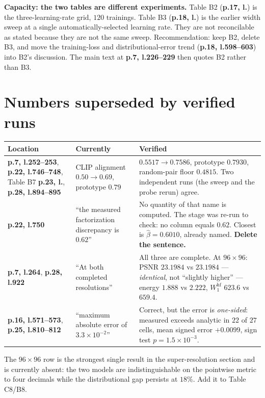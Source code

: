 \documentclass[11pt]{article}
\newcommand{\pl}[2]{\textbf{p.#1, l.#2}}
\begin{document}
\textbf{Capacity: the two tables are different experiments.} Table B2 (\pl{17}{}) is the
three-learning-rate grid, $120$ trainings. Table B3 (\pl{18}{}) is the earlier width sweep at a
single automatically-selected learning rate. They are not reconcilable as stated because they are
not the same sweep. Recommendation: keep B2, delete B3, and move the training-loss and
distributional-error trend (\pl{18}{598--603}) into B2's discussion. The main text at
\pl{7}{226--229} then quotes B2 rather than B3.

\section{Numbers superseded by verified runs}

\begin{longtable}{@{}p{}p{}p{}@{}}
\toprule
Location & Currently & Verified\\
\midrule
\endhead
\pl{7}{252--253}, \pl{22}{746--748}, Table B7 \pl{23}{}, \pl{28}{894--895} &
CLIP alignment $0.50\to0.69$, prototype $0.79$ &
$0.5517\to0.7586$, prototype $0.7930$, random-pair floor $0.4815$. Two independent runs (the
sweep and the probe rerun) agree.\\
\addlinespace
\pl{22}{750} & ``the measured factorization discrepancy is $0.62$'' &
No quantity of that name is computed. The stage was re-run to check: no column equals $0.62$.
Closest is $\hat\beta=0.6010$, already named. \textbf{Delete the sentence.}\\
\addlinespace
\pl{7}{264}, \pl{28}{922} & ``At both completed resolutions'' &
All three are complete. At $96\times96$: PSNR $23.1984$ vs $23.1984$ --- \emph{identical}, not
``slightly higher'' --- energy $1.888$ vs $2.222$, $W_1^{\mathrm{hf}}$ $623.6$ vs $659.4$.\\
\addlinespace
\pl{16}{571--573}, \pl{25}{810--812} & ``maximum absolute error of $3.3\times10^{-2}$'' &
Correct, but the error is \emph{one-sided}: measured exceeds analytic in $22$ of $27$ cells, mean
signed error $+0.0099$, sign test $p=1.5\times10^{-3}$.\\
\bottomrule
\end{longtable}

The $96\times96$ row is the strongest single result in the super-resolution section and is
currently absent: the two models are indistinguishable on the pointwise metric to four decimals
while the distributional gap persists at $18\%$. Add it to Table C8/B8.
\end{document}
